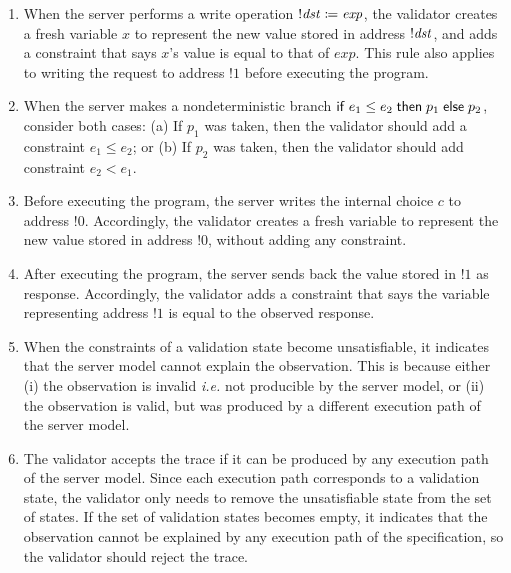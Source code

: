 \begin{enumerate}
\item \label{rule:write} When the server performs a write operation
  $!\mathit{dst}\coloneqq \mathit{exp}$, the validator creates a fresh variable $x$ to represent
  the new value stored in address $!\mathit{dst}$, and adds a constraint that says $x$'s
  value is equal to that of $\mathit{exp}$.  This rule also applies to writing the
  request to address $!1$ before executing the program.
\item \label{rule:branch} When the server makes a nondeterministic branch $\mathsf{if}\;
  e_1\le e_2\;\mathsf{then}\; p_1\;\mathsf{else}\; p_2$, consider both cases: (a) If $p_1$ was taken,
  then the validator should add a constraint $e_1\le e_2$; or (b) If $p_2$ was
  taken, then the validator should add constraint $e_2<e_1$.
\item \label{rule:choice} Before executing the program, the server writes the internal
    choice $c$ to address $!0$.  Accordingly, the validator creates a fresh
    variable to represent the new value stored in address $!0$, without adding
    any constraint.
\item \label{rule:return} After executing the program, the server sends back the
  value stored in $!1$ as response.  Accordingly, the validator adds a
  constraint that says the variable representing address $!1$ is equal to the
  observed response.
\item \label{rule:unsat} When the constraints of a validation state become
  unsatisfiable, it indicates that the server model cannot explain the
  observation.  This is because either (i) the observation is invalid {\it i.e.}
  not producible by the server model, or (ii) the observation is valid, but was
  produced by a different execution path of the server model.
\item \label{rule:reject} The validator accepts the trace if it can be produced
  by any execution path of the server model.  Since each execution path
  corresponds to a validation state, the validator only needs to remove the
  unsatisfiable state from the set of states.  If the set of validation states
  becomes empty, it indicates that the observation cannot be explained by any
  execution path of the specification, so the validator should reject the trace.
\end{enumerate}

